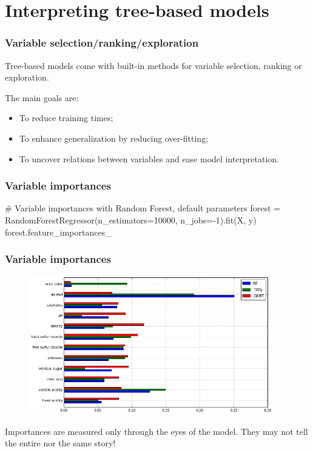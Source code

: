 \documentclass{beamer}
\begin{document}

\section{Interpreting tree-based models}

\begin{frame}[fragile]
  \frametitle{Variable selection/ranking/exploration}

  Tree-based models come with built-in methods for variable selection, ranking
  or exploration.

  \vspace{0.5cm}

  The main goals are:
  \begin{itemize}
  \item To reduce training times;
  \item To enhance generalization by reducing over-fitting;
  \item To uncover relations between variables and ease model interpretation.
  \end{itemize}

\end{frame}

\begin{frame}[fragile]
  \frametitle{Variable importances}

{\scriptsize
\begin{pythoncode}
# Variable importances with Random Forest, default parameters
forest = RandomForestRegressor(n_estimators=10000, n_jobs=-1).fit(X, y)
forest.feature_importances_
\end{pythoncode}
}

\end{frame}

\begin{frame}[fragile]
  \frametitle{Variable importances}

\begin{figure}
\includegraphics[width=0.95\textwidth]{./figures/importances.png}
\end{figure}

\begin{center}
Importances are measured only through the eyes of the model.
{\color{red}They may not tell the entire nor the same story!} \citep{louppe:2013}
\end{center}

\end{frame}
\end{document}
